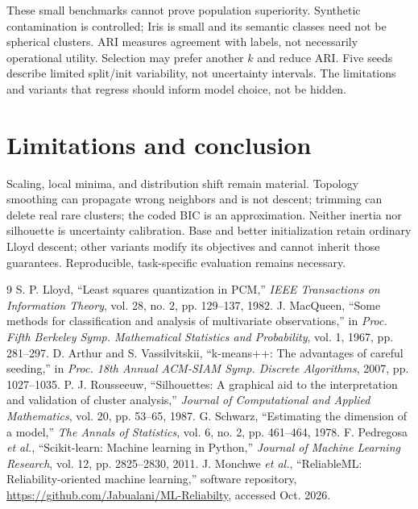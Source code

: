 \documentclass[conference]{IEEEtran}
\begin{document}
These small benchmarks cannot prove population superiority. Synthetic contamination is controlled; Iris is small and its semantic classes need not be spherical clusters. ARI measures agreement with labels, not necessarily operational utility. Selection may prefer another \(k\) and reduce ARI. Five seeds describe limited split/init variability, not uncertainty intervals. The limitations and variants that regress should inform model choice, not be hidden.
\section{Limitations and conclusion}
Scaling, local minima, and distribution shift remain material. Topology smoothing can propagate wrong neighbors and is not descent; trimming can delete real rare clusters; the coded BIC is an approximation. Neither inertia nor silhouette is uncertainty calibration. Base and better initialization retain ordinary Lloyd descent; other variants modify its objectives and cannot inherit those guarantees. Reproducible, task-specific evaluation remains necessary.
\begin{thebibliography}{9}
 S. P. Lloyd, ``Least squares quantization in PCM,'' \emph{IEEE Transactions on Information Theory}, vol. 28, no. 2, pp. 129--137, 1982.
 J. MacQueen, ``Some methods for classification and analysis of multivariate observations,'' in \emph{Proc. Fifth Berkeley Symp. Mathematical Statistics and Probability}, vol. 1, 1967, pp. 281--297.
 D. Arthur and S. Vassilvitskii, ``k-means++: The advantages of careful seeding,'' in \emph{Proc. 18th Annual ACM-SIAM Symp. Discrete Algorithms}, 2007, pp. 1027--1035.
 P. J. Rousseeuw, ``Silhouettes: A graphical aid to the interpretation and validation of cluster analysis,'' \emph{Journal of Computational and Applied Mathematics}, vol. 20, pp. 53--65, 1987.
 G. Schwarz, ``Estimating the dimension of a model,'' \emph{The Annals of Statistics}, vol. 6, no. 2, pp. 461--464, 1978.
 F. Pedregosa \emph{et al.}, ``Scikit-learn: Machine learning in Python,'' \emph{Journal of Machine Learning Research}, vol. 12, pp. 2825--2830, 2011.
 J. Monchwe \emph{et al.}, ``ReliableML: Reliability-oriented machine learning,'' software repository, \url{https://github.com/Jabualani/ML-Reliabilty}, accessed Oct. 2026.
\end{thebibliography}
\end{document}

